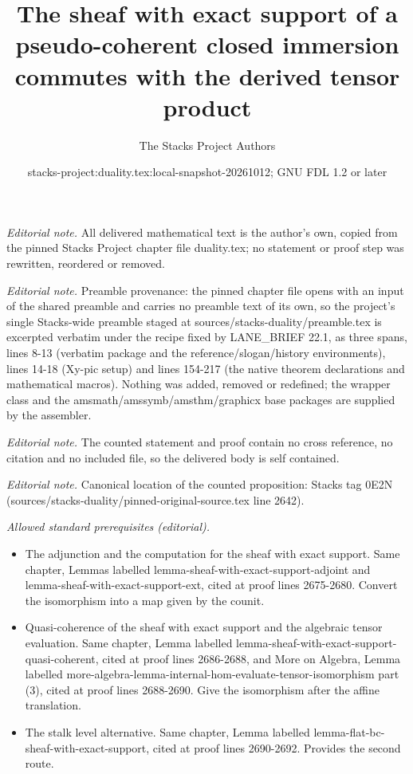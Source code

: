 \documentclass[10pt,a4paper]{amsart}
\title{The sheaf with exact support of a pseudo-coherent closed immersion commutes with the derived tensor product}
\author{The Stacks Project Authors}
\date{stacks-project:duality.tex:local-snapshot-20261012; GNU FDL 1.2 or later}
\theoremstyle{plain}
\theoremstyle{definition}
\theoremstyle{remark}
\numberwithin{equation}{subsection}
\begin{document}
\maketitle
\noindent\textit{Editorial note.} All delivered mathematical text is the author's own, copied from the pinned Stacks Project chapter file duality.tex; no statement or proof step was rewritten, reordered or removed.\par\medskip
\noindent\textit{Editorial note.} Preamble provenance: the pinned chapter file opens with an input of the shared preamble and carries no preamble text of its own, so the project's single Stacks-wide preamble staged at sources/stacks-duality/preamble.tex is excerpted verbatim under the recipe fixed by LANE\_BRIEF 22.1, as three spans, lines 8-13 (verbatim package and the reference/slogan/history environments), lines 14-18 (Xy-pic setup) and lines 154-217 (the native theorem declarations and mathematical macros). Nothing was added, removed or redefined; the wrapper class and the amsmath/amssymb/amsthm/graphicx base packages are supplied by the assembler.\par\medskip
\noindent\textit{Editorial note.} The counted statement and proof contain no cross reference, no citation and no included file, so the delivered body is self contained.\par\medskip
\noindent\textit{Editorial note.} Canonical location of the counted proposition: Stacks tag 0E2N (sources/stacks-duality/pinned-original-source.tex line 2642).\par\medskip
\noindent\textit{Allowed standard prerequisites (editorial).}\begin{itemize}
\item The adjunction and the computation for the sheaf with exact support. Same chapter, Lemmas labelled lemma-sheaf-with-exact-support-adjoint and lemma-sheaf-with-exact-support-ext, cited at proof lines 2675-2680. Convert the isomorphism into a map given by the counit.
\item Quasi-coherence of the sheaf with exact support and the algebraic tensor evaluation. Same chapter, Lemma labelled lemma-sheaf-with-exact-support-quasi-coherent, cited at proof lines 2686-2688, and More on Algebra, Lemma labelled more-algebra-lemma-internal-hom-evaluate-tensor-isomorphism part (3), cited at proof lines 2688-2690. Give the isomorphism after the affine translation.
\item The stalk level alternative. Same chapter, Lemma labelled lemma-flat-bc-sheaf-with-exact-support, cited at proof lines 2690-2692. Provides the second route.
\end{itemize}\medskip
\end{document}
